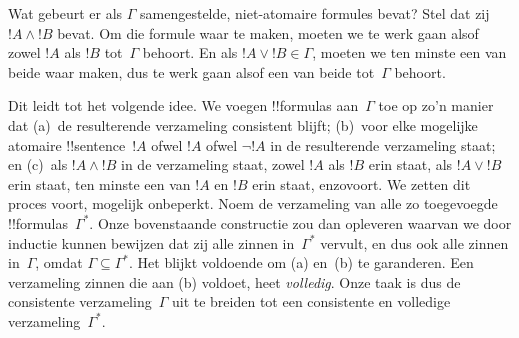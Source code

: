 \documentclass[../../../include/open-logic-section]{subfiles}
\begin{document}
Wat gebeurt er als $\Gamma$ samengestelde, niet-atomaire formules
bevat? Stel dat zij $!A \land !B$ bevat. Om die formule waar te maken,
moeten we te werk gaan alsof zowel $!A$ als $!B$ tot~$\Gamma$ behoort.
En als $!A \lor !B \in \Gamma$, moeten we ten minste een van beide
waar maken, dus te werk gaan alsof een van beide tot~$\Gamma$ behoort.

Dit leidt tot het volgende idee. We voegen !!{formula}s aan~$\Gamma$
toe op zo'n manier dat (a)~de resulterende verzameling consistent
blijft; (b)~voor elke mogelijke atomaire !!{sentence}~$!A$ ofwel $!A$
ofwel $\lnot !A$ in de resulterende verzameling staat; en (c)~als
$!A \land !B$ in de verzameling staat, zowel $!A$ als $!B$ erin staat,
als $!A \lor !B$ erin staat, ten minste een van $!A$ en $!B$ erin staat,
enzovoort. We zetten dit proces voort, mogelijk onbeperkt. Noem de
verzameling van alle zo toegevoegde !!{formula}s~$\Gamma^*$. Onze
bovenstaande constructie zou dan
opleveren waarvan we door inductie kunnen bewijzen dat zij alle zinnen
in~$\Gamma^*$ vervult, en dus ook alle zinnen in~$\Gamma$, omdat
$\Gamma \subseteq \Gamma^*$. Het blijkt voldoende om (a) en~(b) te
garanderen. Een verzameling zinnen die aan (b) voldoet, heet
\emph{volledig}. Onze taak is dus de consistente verzameling~$\Gamma$
uit te breiden tot een consistente en volledige verzameling~$\Gamma^*$.
\end{document}
